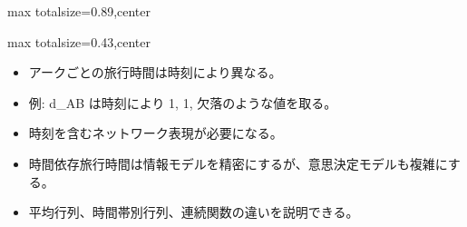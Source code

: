 \begin{minipage}[t]{0.58\textwidth}
\begin{adjustbox}{max totalsize={\textwidth}{0.89\textheight},center}
\begin{minipage}{\textwidth}
\end{minipage}
\end{adjustbox}
\end{minipage}


\clearpage
{}
\begin{minipage}[t]{0.405\textwidth}
\begin{adjustbox}{max totalsize={\textwidth}{0.43\textheight},center}
\begin{minipage}{\textwidth}\scriptsize
{}\begin{itemize}
\item アークごとの旅行時間は時刻により異なる。
\item 例: d\_AB は時刻により 1, 1, 欠落のような値を取る。
\item 時刻を含むネットワーク表現が必要になる。
\end{itemize}\begin{itemize}
\item 時間依存旅行時間は情報モデルを精密にするが、意思決定モデルも複雑にする。
\item 平均行列、時間帯別行列、連続関数の違いを説明できる。
\end{itemize}
\end{minipage}
\end{adjustbox}
\end{minipage}\hfill
